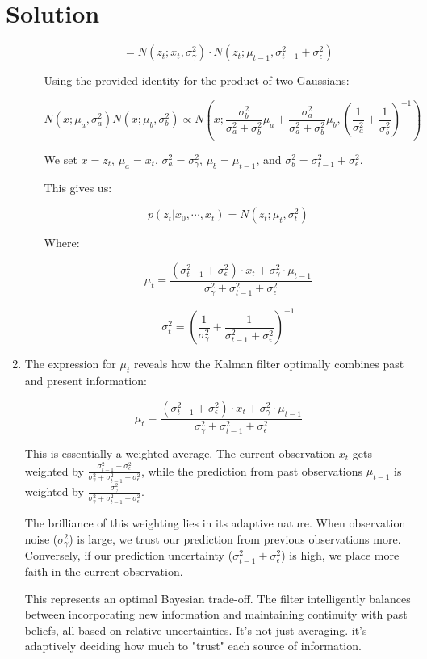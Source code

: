 \documentclass[submit]{../harvardml}
\newcommand{\sigeps}{\sigma_{\epsilon}}
\newcommand{\siggam}{\sigma_{\gamma}}
\newenvironment{solution}
  {\color{blue}\section*{Solution}}
{}
\begin{document}
\begin{solution}
\begin{enumerate}
\begin{enumerate}
        $$= N(z_t; x_t, \siggam^2) \cdot N(z_t; \mu_{t-1}, \sigma^2_{t-1} + \sigeps^2)$$
        
        Using the provided identity for the product of two Gaussians:
        
        $$N(x; \mu_a, \sigma^2_a)N(x; \mu_b, \sigma^2_b) \propto N\left(x; \frac{\sigma^2_b}{\sigma^2_a+\sigma^2_b}\mu_a + \frac{\sigma^2_a}{\sigma^2_a+\sigma^2_b}\mu_b, \left(\frac{1}{\sigma^2_a} + \frac{1}{\sigma^2_b}\right)^{-1}\right)$$
        
        We set $x = z_t$, $\mu_a = x_t$, $\sigma^2_a = \siggam^2$, $\mu_b = \mu_{t-1}$, and $\sigma^2_b = \sigma^2_{t-1} + \sigeps^2$.
        
        This gives us:
        
        $$p(z_t|x_0, \cdots, x_t) = N(z_t; \mu_t, \sigma^2_t)$$
        
        Where:
        
        $$\mu_t = \frac{(\sigma^2_{t-1} + \sigeps^2) \cdot x_t + \siggam^2 \cdot \mu_{t-1}}{\siggam^2 + \sigma^2_{t-1} + \sigeps^2}$$
        
        $$\sigma^2_t = \left(\frac{1}{\siggam^2} + \frac{1}{\sigma^2_{t-1} + \sigeps^2}\right)^{-1}$$
    \end{enumerate}
    
    \item The expression for $\mu_t$ reveals how the Kalman filter optimally combines past and present information:
    
    $$\mu_t = \frac{(\sigma^2_{t-1} + \sigeps^2) \cdot x_t + \siggam^2 \cdot \mu_{t-1}}{\siggam^2 + \sigma^2_{t-1} + \sigeps^2}$$
    
    This is essentially a weighted average. The current observation $x_t$ gets weighted by $\frac{\sigma^2_{t-1} + \sigeps^2}{\siggam^2 + \sigma^2_{t-1} + \sigeps^2}$, while the prediction from past observations $\mu_{t-1}$ is weighted by $\frac{\siggam^2}{\siggam^2 + \sigma^2_{t-1} + \sigeps^2}$.
    
    The brilliance of this weighting lies in its adaptive nature. When observation noise ($\siggam^2$) is large, we trust our prediction from previous observations more. Conversely, if our prediction uncertainty ($\sigma^2_{t-1} + \sigeps^2$) is high, we place more faith in the current observation.
    
    This represents an optimal Bayesian trade-off. The filter intelligently balances between incorporating new information and maintaining continuity with past beliefs, all based on relative uncertainties. It's not just averaging. it's adaptively deciding how much to "trust" each source of information.
\end{enumerate}
\end{solution}
\end{document}
